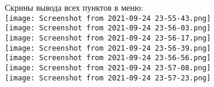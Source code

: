 \documentclass[a4paper,11pt]{article}
\begin{document}
\begin{flushleft}
Скрины вывода всех пунктов в меню: \\
\texttt{[image: Screenshot from 2021-09-24 23-55-43.png]} \\
\texttt{[image: Screenshot from 2021-09-24 23-56-03.png]} \\
\texttt{[image: Screenshot from 2021-09-24 23-56-17.png]} \\
\texttt{[image: Screenshot from 2021-09-24 23-56-39.png]} \\
\texttt{[image: Screenshot from 2021-09-24 23-56-56.png]} \\
\texttt{[image: Screenshot from 2021-09-24 23-57-08.png]} \\
\texttt{[image: Screenshot from 2021-09-24 23-57-23.png]} \\
\end{flushleft}
\end{document}
